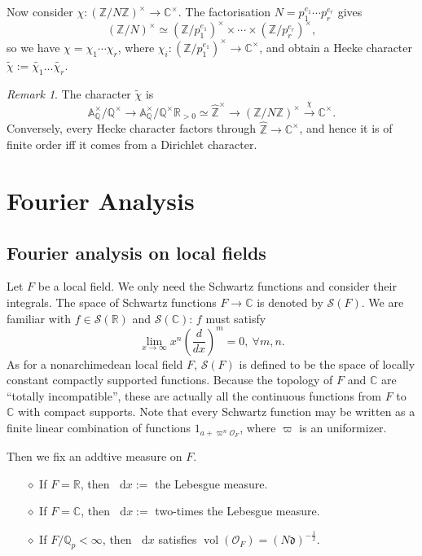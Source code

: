 \documentclass{article}
\theoremstyle{definition}
\theoremstyle{remark}
\newtheorem*{remark}{Remark}
\renewcommand{\tilde}{\widetilde}
\renewcommand{\hat}{\widehat}
\newcommand{\R}{\mathbb{R}}
\newcommand{\C}{\mathbb{C}}
\newcommand{\Q}{\mathbb{Q}}
\newcommand{\Z}{\mathbb{Z}}
\newcommand{\idele}[1]{\mathbb{A}_{#1}^{\times}}
\newcommand{\dx}{\mathop{}\!\mathrm{d}x}
\newcommand{\diff}{\mathfrak{d}}
\renewcommand{\O}{\mathcal{O}}
\DeclareMathOperator{\vol}{vol}
\newcommand{\myit}{$\diamond$}
\begin{document}
Now consider $\chi : (\Z/N\Z)^{\times}\to\C^\times$. The factorisation $N = p_1^{e_1}\cdots p_r^{e_r}$ gives \[(\Z/N)^\times \simeq (\Z/p_1^{e_1})^\times \times\cdots\times(\Z/p_{r}^{e_r})^\times,\]
so we have $\chi = \chi_1\cdots\chi_r$, where $\chi_i : (\Z/p_1^{e_1})^\times\to\C^\times$,
and obtain a Hecke character $\tilde{\chi} := \tilde{\chi_1}\dots\tilde{\chi_r}$.

\begin{remark}
    The character $\tilde{\chi}$ is \[\idele{\Q}/\Q^\times\to\idele{\Q}/\Q^\times\R_{>0}\simeq\hat{\Z}^\times\to (\Z/N\Z)^\times \stackrel{\chi}{\to}\C^\times.\]
    Conversely, every Hecke character factors through $\hat{\Z}\to\C^\times$, and hence it is of finite order iff it comes from a Dirichlet character.
\end{remark}

\section{Fourier Analysis}

\subsection{Fourier analysis on local fields}
Let $F$ be a local field. 
We only need the Schwartz functions and consider their integrals. The space of Schwartz functions $F \to\C$ is denoted by $\mathcal{S}(F)$.
We are familiar with $f\in \mathcal{S}(\R)$ and $\mathcal{S}(\C)$: $f$ must satisfy \[\lim_{x\to\infty}x^n \left( \frac{d}{dx} \right)^m = 0,\ \forall m, n.\]
As for a nonarchimedean local field $F$, $\mathcal{S}(F)$ is defined to be the space of locally constant compactly supported functions. Because the topology of $F$ and $\C$ are ``totally incompatible'', these are actually all the continuous functions from $F$ to $\C$ with compact supports.
Note that every Schwartz function may be written as a finite linear combination of functions $1_{a+\varpi^n\O_F}$, where $\varpi$ is an uniformizer.

Then we fix an addtive measure on $F$.
\begin{enumerate}
    \item [\myit] If $F = \R$, then $\dx := $ the Lebesgue measure.
    \item [\myit] If $F = \C$, then $\dx := $ two-times the Lebesgue measure.
    \item [\myit] If $F/\Q_p<\infty$, then $\dx$ satisfies $\vol(\O_{F}) = (N\diff)^{-\frac{1}{2}}$.
\end{enumerate}
\end{document}
